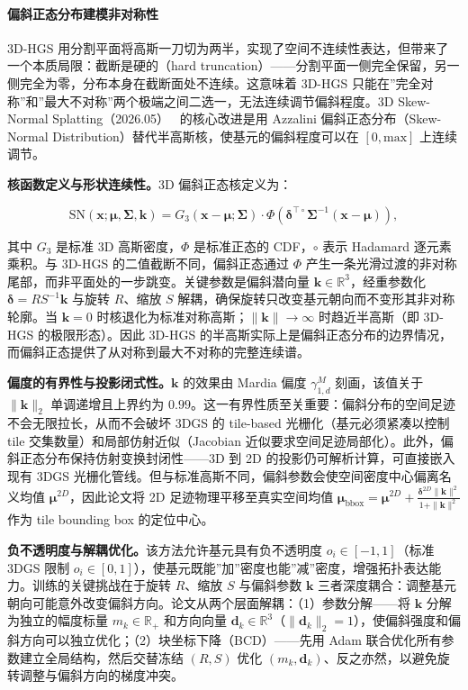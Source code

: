 \paragraph{偏斜正态分布建模非对称性}

3D-HGS 用分割平面将高斯一刀切为两半，实现了空间不连续性表达，但带来了一个本质局限：截断是硬的（hard truncation）——分割平面一侧完全保留，另一侧完全为零，分布本身在截断面处不连续。这意味着 3D-HGS 只能在”完全对称”和”最大不对称”两个极端之间二选一，无法连续调节偏斜程度。3D Skew-Normal Splatting（2026.05）~\cite{2605_15010} 的核心改进是用 Azzalini 偏斜正态分布（Skew-Normal Distribution）替代半高斯核，使基元的偏斜程度可以在 $[0, \text{max}]$ 上连续调节。

\textbf{核函数定义与形状连续性。}3D 偏斜正态核定义为：

\begin{equation}
\text{SN}(\mathbf{x}; \boldsymbol{\mu}, \boldsymbol{\Sigma}, \mathbf{k}) = G_3(\mathbf{x} - \boldsymbol{\mu}; \boldsymbol{\Sigma}) \cdot \Phi\!\left(\boldsymbol{\delta}^{\top \circ} \boldsymbol{\Sigma}^{-1}(\mathbf{x} - \boldsymbol{\mu})\right),
\end{equation}

其中 $G_3$ 是标准 3D 高斯密度，$\Phi$ 是标准正态的 CDF，$\circ$ 表示 Hadamard 逐元素乘积。与 3D-HGS 的二值截断不同，偏斜正态通过 $\Phi$ 产生一条光滑过渡的非对称尾部，而非平面处的一步跳变。关键参数是偏斜潜向量 $\mathbf{k} \in \mathbb{R}^3$，经重参数化 $\boldsymbol{\delta} = R S^{-1} \mathbf{k}$ 与旋转 $R$、缩放 $S$ 解耦，确保旋转只改变基元朝向而不变形其非对称轮廓。当 $\mathbf{k} = 0$ 时核退化为标准对称高斯；$\|\mathbf{k}\| \to \infty$ 时趋近半高斯（即 3D-HGS 的极限形态）。因此 3D-HGS 的半高斯实际上是偏斜正态分布的边界情况，而偏斜正态提供了从对称到最大不对称的完整连续谱。

\textbf{偏度的有界性与投影闭式性。}$\mathbf{k}$ 的效果由 Mardia 偏度 $\gamma_{1,d}^M$ 刻画，该值关于 $\|\mathbf{k}\|_2$ 单调递增且上界约为 $0.99$。这一有界性质至关重要：偏斜分布的空间足迹不会无限拉长，从而不会破坏 3DGS 的 tile-based 光栅化（基元必须紧凑以控制 tile 交集数量）和局部仿射近似（Jacobian 近似要求空间足迹局部化）。此外，偏斜正态分布保持仿射变换封闭性——3D 到 2D 的投影仍可解析计算，可直接嵌入现有 3DGS 光栅化管线。但与标准高斯不同，偏斜参数会使空间密度中心偏离名义均值 $\boldsymbol{\mu}^{2D}$，因此论文将 2D 足迹物理平移至真实空间均值 $\boldsymbol{\mu}_{\text{bbox}} = \boldsymbol{\mu}^{2D} + \frac{\boldsymbol{\delta}^{2D} \|\mathbf{k}\|^2}{1 + \|\mathbf{k}\|^2}$ 作为 tile bounding box 的定位中心。

\textbf{负不透明度与解耦优化。}该方法允许基元具有负不透明度 $o_i \in [-1, 1]$（标准 3DGS 限制 $o_i \in [0, 1]$），使基元既能”加”密度也能”减”密度，增强拓扑表达能力。训练的关键挑战在于旋转 $R$、缩放 $S$ 与偏斜参数 $\mathbf{k}$ 三者深度耦合：调整基元朝向可能意外改变偏斜方向。论文从两个层面解耦：（1）参数分解——将 $\mathbf{k}$ 分解为独立的幅度标量 $m_k \in \mathbb{R}_+$ 和方向向量 $\mathbf{d}_k \in \mathbb{R}^3$（$\|\mathbf{d}_k\|_2 = 1$），使偏斜强度和偏斜方向可以独立优化；（2）块坐标下降（BCD）——先用 Adam 联合优化所有参数建立全局结构，然后交替冻结 $(R, S)$ 优化 $(m_k, \mathbf{d}_k)$、反之亦然，以避免旋转调整与偏斜方向的梯度冲突。

